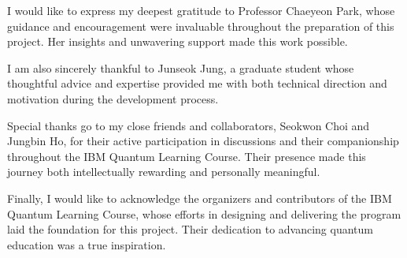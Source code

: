 

I would like to express my deepest gratitude to Professor Chaeyeon Park, whose guidance and encouragement were invaluable throughout the preparation of this project. Her insights and unwavering support made this work possible.

I am also sincerely thankful to Junseok Jung, a graduate student whose thoughtful advice and expertise provided me with both technical direction and motivation during the development process.

Special thanks go to my close friends and collaborators, Seokwon Choi and Jungbin Ho, for their active participation in discussions and their companionship throughout the IBM Quantum Learning Course. Their presence made this journey both intellectually rewarding and personally meaningful.

Finally, I would like to acknowledge the organizers and contributors of the IBM Quantum Learning Course, whose efforts in designing and delivering the program laid the foundation for this project. Their dedication to advancing quantum education was a true inspiration.


\MediaOptionLogicBlank